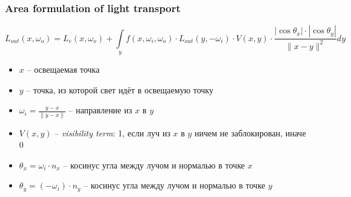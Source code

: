 \documentclass[handout,10pt]{beamer}
\begin{document}
\begin{frame}
\frametitle{Area formulation of light transport}
\begin{equation*}
L_{out}(x, \omega_o) = L_e(x, \omega_o) + \int\limits_y f(x,\omega_i,\omega_o) \cdot L_{out}(y, -\omega_i) \cdot V(x,y)\cdot \frac{|\cos \theta_x| \cdot |\cos \theta_y|}{\|x-y\|^2} dy
\end{equation*}
\pause
\begin{itemize}
\item \begin{math}x\end{math} -- освещаемая точка
\pause
\item \begin{math}y\end{math} -- точка, из которой свет идёт в освещаемую точку
\pause
\item \begin{math}\omega_i = \frac{y-x}{\|y-x\|}\end{math} -- направление из \begin{math}x\end{math} в \begin{math}y\end{math}
\pause
\item \begin{math}V(x,y)\end{math} -- \textit{visibility term}: 1, если луч из \begin{math}x\end{math} в \begin{math}y\end{math} ничем не заблокирован, иначе 0
\pause
\item \begin{math}\theta_x = \omega_i \cdot n_x\end{math} -- косинус угла между лучом и нормалью в точке \begin{math}x\end{math}
\pause
\item \begin{math}\theta_y = (-\omega_i) \cdot n_y\end{math} -- косинус угла между лучом и нормалью в точке \begin{math}y\end{math}
\end{itemize}
\end{frame}
\end{document}

